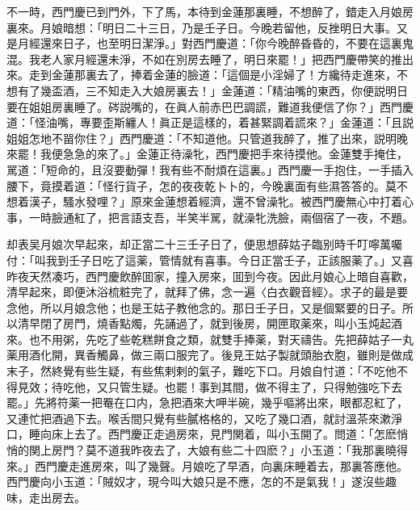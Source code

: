 不一時，西門慶已到門外，下了馬，本待到金蓮那裏睡，不想醉了，錯走入月娘房裏來。月娘暗想：「明日二十三日，乃是壬子日。今晚若留他，反挫明日大事。又是月經還來日子，也至明日潔淨。」對西門慶道：「你今晚醉昏昏的，不要在這裏鬼混。我老人家月經還未淨，不如在別房去睡了，明日來罷！」把西門慶帶笑的推出來。走到金蓮那裏去了，捧着金蓮的臉道：「這個是小淫婦了！方纔待走進來，不想有了幾盃酒，三不知走入大娘房裏去！」金蓮道：「精油嘴的東西，你便説明日要在姐姐房裏睡了。硶説嘴的，在眞人前赤巴巴調謊，難道我便信了你？」西門慶道：「怪油嘴，專要歪斯纏人！眞正是這樣的，着甚緊調着謊來？」金蓮道：「且説姐姐怎地不㽞你住？」西門慶道：「不知道他。只管道我醉了，推了出來，説明晚來罷！我便急急的來了。」金蓮正待澡牝，西門慶把手來待摸他。金蓮雙手掩住，駡道：「短命的，且沒要動彈！我有些不耐煩在這裏。」西門慶一手抱住，一手插入腰下，竟摸着道：「怪行貨子，怎的夜夜乾卜卜的，今晚裏面有些濕答答的。莫不想着漢子，騷水發哩？」原來金蓮想着經濟，還不曾澡牝。被西門慶無心中打着心事，一時臉通紅了，把言語支吾，半笑半駡，就澡牝洗臉，兩個宿了一夜，不題。

却表吴月娘次早起來，却正當二十三壬子日了，便思想薛姑子臨别時千叮嚀萬囑付：「叫我到壬子日吃了這薬，管情就有喜事。今日正當壬子，正該服薬了。」又喜昨夜天然凑巧，西門慶飲醉囬家，撞入房來，囬到今夜。因此月娘心上暗自喜歡，清早起來，即便沐浴梳粧完了，就拜了佛，念一遍〈白衣觀音經〉。求子的最是要念他，所以月娘念他；也是王姑子教他念的。那日壬子日，又是個緊要的日子。所以清早閉了房門，燒香點燭，先誦過了，就到後房，開匣取薬來，叫小玉炖起酒來。也不用粥，先吃了些乾糕餅食之類，就雙手捧薬，對天禱告。先把薛姑子一丸薬用酒化開，異香觸鼻，做三兩口服完了。後見王姑子製就頭胎衣胞，雖則是做成末子，然終覺有些生疑，有些焦剌剌的氣子，難吃下口。月娘自忖道：「不吃他不得見效；待吃他，又只管生疑。也罷！事到其間，做不得主了，只得勉強吃下去罷。」先將符薬一把罨在口内，急把酒來大呷半碗，幾乎嘔將出來，眼都忍紅了，又連忙把酒過下去。喉舌間只覺有些膩格格的，又吃了幾口酒，就討溫茶來漱淨口，睡向床上去了。西門慶正走過房來，見門関着，叫小玉開了。問道：「怎麽悄悄的関上房門？莫不道我昨夜去了，大娘有些二十四麽？」小玉道：「我那裏曉得來。」西門慶走進房來，叫了幾聲。月娘吃了早酒，向裏床睡着去，那裏答應他。西門慶向小玉道：「賊奴才，現今叫大娘只是不應，怎的不是氣我！」遂沒些趣味，走出房去。

